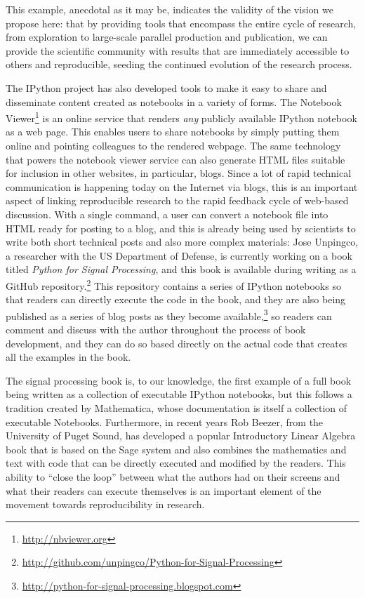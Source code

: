 \documentclass[11pt,oneside,english]{article}
\begin{document}
This example, anecdotal as it may be, indicates the validity of the vision
we propose here: that by providing tools that encompass the entire cycle of
research, from exploration to large-scale parallel production and publication,
we can provide the scientific community with results that are immediately
accessible to others and reproducible, seeding the continued evolution of the
research process.

The IPython project has also developed tools to make it easy to share and
disseminate content created as notebooks in a variety of forms.  The Notebook
Viewer\footnote{\url{http://nbviewer.org}} is an online service that renders
\emph{any} publicly available IPython notebook as a web page.  This enables
users to share notebooks by simply putting them online and pointing colleagues
to the rendered webpage.  The same technology that powers the notebook viewer
service can also generate HTML files suitable for inclusion in other websites,
in particular, blogs.  Since a lot of rapid technical communication is
happening today on the Internet via blogs, this is an important aspect of
linking reproducible research to the rapid feedback cycle of web-based
discussion.  With a single command, a user can convert a notebook file into
HTML ready for posting to a blog, and this is already being used by scientists
to write both short technical posts and also more complex materials: Jose
Unpingco, a researcher with the US Department of Defense, is currently working
on a book titled \emph{Python for Signal Processing}, and this book is
available during writing as a GitHub
repository.\footnote{\url{http://github.com/unpingco/Python-for-Signal-Processing}}
This repository contains a series of IPython notebooks so that readers can
directly execute the code in the book, and they are also being published as a
series of blog posts as they become
available,\footnote{\url{http://python-for-signal-processing.blogspot.com}} so
readers can comment and discuss with the author throughout the process of book
development, and they can do so based directly on the actual code that creates
all the examples in the book.

The signal processing book is, to our knowledge, the first example of a full
book being written as a collection of executable IPython notebooks, but this
follows a tradition created by Mathematica, whose documentation is itself a
collection of executable Notebooks.  Furthermore, in recent years Rob Beezer,
from the University of Puget Sound, has developed a popular Introductory Linear
Algebra book \cite{beezer2009first} that is based on the Sage system and also
combines the mathematics and text with code that can be directly executed and
modified by the readers.  This ability to ``close the loop'' between what the
authors had on their screens and what their readers can execute themselves is
an important element of the movement towards reproducibility in research.
\end{document}
